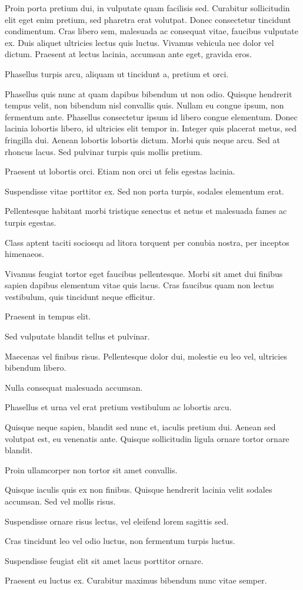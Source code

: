Proin porta pretium dui, in vulputate quam facilisis sed. Curabitur sollicitudin elit eget enim pretium, sed pharetra erat volutpat. Donec consectetur tincidunt condimentum. Cras libero sem, malesuada ac consequat vitae, faucibus vulputate ex. Duis aliquet ultricies lectus quis luctus. Vivamus vehicula nec dolor vel dictum. Praesent at lectus lacinia, accumsan ante eget, gravida eros.

Phasellus turpis arcu, aliquam ut tincidunt a, pretium et orci.

Phasellus quis nunc at quam dapibus bibendum ut non odio. Quisque hendrerit tempus velit, non bibendum nisl convallis quis. Nullam eu congue ipsum, non fermentum ante. Phasellus consectetur ipsum id libero congue elementum. Donec lacinia lobortis libero, id ultricies elit tempor in. Integer quis placerat metus, sed fringilla dui. Aenean lobortis lobortis dictum. Morbi quis neque arcu. Sed at rhoncus lacus. Sed pulvinar turpis quis mollis pretium.

Praesent ut lobortis orci. Etiam non orci ut felis egestas lacinia.

Suspendisse vitae porttitor ex. Sed non porta turpis, sodales elementum erat.

Pellentesque habitant morbi tristique senectus et netus et malesuada fames ac turpis egestas.

Class aptent taciti sociosqu ad litora torquent per conubia nostra, per inceptos himenaeos.

Vivamus feugiat tortor eget faucibus pellentesque. Morbi sit amet dui finibus sapien dapibus elementum vitae quis lacus. Cras faucibus quam non lectus vestibulum, quis tincidunt neque efficitur.

Praesent in tempus elit.

Sed vulputate blandit tellus et pulvinar.

Maecenas vel finibus risus. Pellentesque dolor dui, molestie eu leo vel, ultricies bibendum libero.

Nulla consequat malesuada accumsan.

Phasellus et urna vel erat pretium vestibulum ac lobortis arcu.

Quisque neque sapien, blandit sed nunc et, iaculis pretium dui. Aenean sed volutpat est, eu venenatis ante. Quisque sollicitudin ligula ornare tortor ornare blandit.

Proin ullamcorper non tortor sit amet convallis.

Quisque iaculis quis ex non finibus. Quisque hendrerit lacinia velit sodales accumsan. Sed vel mollis risus.

Suspendisse ornare risus lectus, vel eleifend lorem sagittis sed.

Cras tincidunt leo vel odio luctus, non fermentum turpis luctus.

Suspendisse feugiat elit sit amet lacus porttitor ornare.

Praesent eu luctus ex. Curabitur maximus bibendum nunc vitae semper.